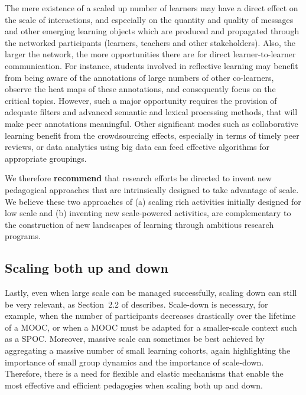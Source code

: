 The mere existence of a scaled up number of learners may have a direct
effect on the scale of interactions, and especially on the quantity and
quality of messages and other emerging learning objects which are
produced and propagated through the networked participants (learners,
teachers and other stakeholders). Also, the larger the network, the more
opportunities there are for direct learner-to-learner communication. For
instance, students involved in reflective learning may benefit from
being aware of the annotations of large numbers of other co-learners,
observe the heat maps of these annotations, and consequently focus on
the critical topics. However, such a major opportunity requires the
provision of adequate filters and advanced semantic and lexical
processing methods, that will make peer annotations meaningful. Other
significant modes such as collaborative learning benefit from the
crowdsourcing effects, especially in terms of timely peer reviews, or
data analytics using big data can feed effective algorithms for
appropriate groupings.

We therefore \textbf{recommend} that research efforts be directed to invent new
pedagogical approaches that are intrinsically designed to take advantage
of scale. We believe these two approaches of (a) scaling rich activities
initially designed for low scale and (b) inventing new scale-powered
activities, are complementary to the construction of new landscapes of
learning through ambitious research programs.

\subsection{Scaling both up and down}

Lastly, even when large scale can be managed successfully, 
scaling down can still be very relevant, as 
Section~2.2 of \cite{mroe-2013-report} describes.
Scale-down is necessary, for example, when the number of
participants decreases drastically over the lifetime of a
MOOC, or when a MOOC must be adapted for a smaller-scale context such as
a SPOC.  
Moreover, massive scale can sometimes be best
achieved by aggregating a massive number of small learning cohorts,
again highlighting the importance of small group dynamics and the
importance of scale-down.
Therefore, there is a need for flexible and
elastic mechanisms that enable the most effective and efficient
pedagogies when scaling both up and down.  


